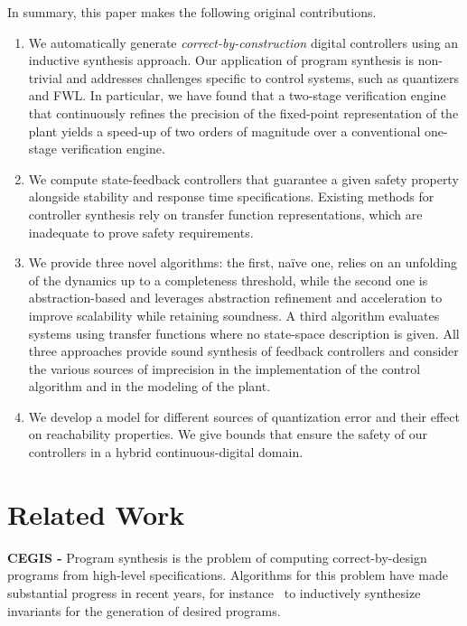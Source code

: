 \documentclass[twocolumn]{autart}    %
\begin{document}
In summary, this paper makes the following original contributions.
%
\begin{enumerate}

\item We automatically generate {\em correct-by-construction} digital
  controllers using an inductive synthesis approach.  Our application of program
  synthesis is non-trivial and addresses challenges specific to control
  systems, such as quantizers and FWL.  In particular, we
  have found that a two-stage verification engine that continuously refines
  the precision of the fixed-point representation of the plant yields a
  speed-up of two orders of magnitude over a conventional one-stage
  verification engine.
%
\item  We compute state-feedback controllers that 
  guarantee a given safety property alongside stability and response time
  specifications.  Existing methods for controller synthesis rely on transfer
  function representations, which are inadequate to prove safety requirements.
%
\item We provide three novel algorithms: the first, na\"ive one, relies on
  an unfolding of the dynamics up to a completeness threshold, while the
  second one is abstraction-based and leverages abstraction refinement and
  acceleration to improve scalability while retaining soundness.  A third
  algorithm evaluates systems using transfer functions where no state-space
  description is given.  All three approaches provide sound synthesis of
  feedback controllers and consider the various sources of imprecision in
  the implementation of the control algorithm and in the modeling of the
  plant.
%
\item We develop a model for different sources of quantization error and
  their effect on reachability properties.  We give bounds that ensure the
  safety of our controllers in a hybrid continuous-digital domain.
\end{enumerate}

\section{Related Work}
\label{sec:relw}

\textbf{CEGIS -}
Program synthesis is the problem of computing correct-by-design programs
from high-level specifications. Algorithms for this problem have made
substantial progress in recent years, for instance~\cite{itzhaky2010simple} 
to inductively synthesize invariants for the generation of desired programs.
\end{document}
